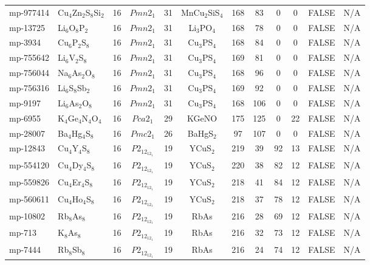 {\begin{longtable}{llcccccccccc}
    mp-977414 & Cu$_{4}$Zn$_{2}$S$_{8}$Si$_{2}$ & 16    & $Pmn2_1$ & 31    & MnCu$_{2}$SiS$_{4}$ & 168   & 83    & 0     & 0     & FALSE & N/A \\
    mp-13725 & Li$_{6}$O$_{8}$P$_{2}$ & 16    & $Pmn2_1$ & 31    & Li$_{3}$PO$_{4}$ & 168   & 78    & 0     & 0     & FALSE & N/A \\
    mp-3934 & Cu$_{6}$P$_{2}$S$_{8}$ & 16    & $Pmn2_1$ & 31    & Cu$_{3}$PS$_{4}$ & 168   & 84    & 0     & 0     & FALSE & N/A \\
    mp-755642 & Li$_{6}$V$_{2}$S$_{8}$ & 16    & $Pmn2_1$ & 31    & Cu$_{3}$PS$_{4}$ & 169   & 81    & 0     & 0     & FALSE & N/A \\
    mp-756044 & Na$_{6}$As$_{2}$O$_{8}$ & 16    & $Pmn2_1$ & 31    & Cu$_{3}$PS$_{4}$ & 168   & 96    & 0     & 0     & FALSE & N/A \\
    mp-756316 & Li$_{6}$S$_{8}$Sb$_{2}$ & 16    & $Pmn2_1$ & 31    & Cu$_{3}$PS$_{4}$ & 169   & 92    & 0     & 0     & FALSE & N/A \\
    mp-9197 & Li$_{6}$As$_{2}$O$_{8}$ & 16    & $Pmn2_1$ & 31    & Cu$_{3}$PS$_{4}$ & 168   & 106   & 0     & 0     & FALSE & N/A \\
    mp-6955 & K$_{4}$Ge$_{4}$N$_{4}$O$_{4}$ & 16    & $Pca2_1$ & 29    & KGeNO & 175   & 125   & 0     & 22    & FALSE & N/A \\
    mp-28007 & Ba$_{4}$Hg$_{4}$S$_{8}$ & 16    & $Pmc2_1$ & 26    & BaHgS$_{2}$ & 97    & 107   & 0     & 0     & FALSE & N/A \\
    mp-12843 & Cu$_{4}$Y$_{4}$S$_{8}$ & 16    & $P2_12_12_1$ & 19    & YCuS$_{2}$ & 219   & 39    & 92    & 13    & FALSE & N/A \\
    mp-554120 & Cu$_{4}$Dy$_{4}$S$_{8}$ & 16    & $P2_12_12_1$ & 19    & YCuS$_{2}$ & 220   & 38    & 82    & 12    & FALSE & N/A \\
    mp-559826 & Cu$_{4}$Er$_{4}$S$_{8}$ & 16    & $P2_12_12_1$ & 19    & YCuS$_{2}$ & 218   & 41    & 84    & 12    & FALSE & N/A \\
    mp-560611 & Cu$_{4}$Ho$_{4}$S$_{8}$ & 16    & $P2_12_12_1$ & 19    & YCuS$_{2}$ & 218   & 37    & 78    & 12    & FALSE & N/A \\
    mp-10802 & Rb$_{8}$As$_{8}$ & 16    & $P2_12_12_1$ & 19    & RbAs  & 216   & 28    & 69    & 12    & FALSE & N/A \\
    mp-713 & K$_{8}$As$_{8}$ & 16    & $P2_12_12_1$ & 19    & RbAs  & 216   & 32    & 73    & 12    & FALSE & N/A \\
    mp-7444 & Rb$_{8}$Sb$_{8}$ & 16    & $P2_12_12_1$ & 19    & RbAs  & 216   & 24    & 74    & 12    & FALSE & N/A \\

\end{longtable}}
